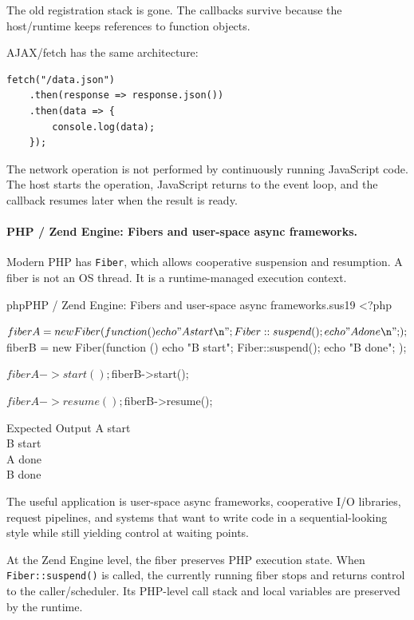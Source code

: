 The old registration stack is gone. The callbacks survive because the host/runtime keeps references to function objects.

AJAX/fetch has the same architecture:

\begin{verbatim}
fetch("/data.json")
    .then(response => response.json())
    .then(data => {
        console.log(data);
    });
\end{verbatim}

The network operation is not performed by continuously running JavaScript code. The host starts the operation, JavaScript returns to the event loop, and the callback resumes later when the result is ready.

\paragraph{PHP / Zend Engine: Fibers and user-space async frameworks.}

Modern PHP has \texttt{Fiber}, which allows cooperative suspension and resumption. A fiber is not an OS thread. It is a runtime-managed execution context.

\begin{codebox}[]{php}{PHP / Zend Engine: Fibers and user-space async frameworks.}{sus19}
<?php

$fiberA = new Fiber(function () {
    echo "A start\n";
    Fiber::suspend();
    echo "A done\n";
});

$fiberB = new Fiber(function () {
    echo "B start\n";
    Fiber::suspend();
    echo "B done\n";
});

$fiberA->start();
$fiberB->start();

$fiberA->resume();
$fiberB->resume();
\end{codebox}


\begin{iobox}{Expected Output}
A start \\
B start \\
A done \\
B done \\
\end{iobox}


The useful application is user-space async frameworks, cooperative I/O libraries, request pipelines, and systems that want to write code in a sequential-looking style while still yielding control at waiting points.

At the Zend Engine level, the fiber preserves PHP execution state. When \texttt{Fiber::suspend()} is called, the currently running fiber stops and returns control to the caller/scheduler. Its PHP-level call stack and local variables are preserved by the runtime.

